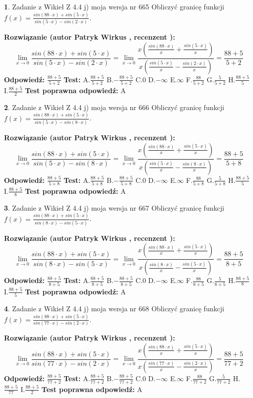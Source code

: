 \documentclass[12pt, a4paper]{article}
\theoremstyle{definition} %
\newtheorem{zad}{}
\newcommand{\zadStart}[1]{\begin{zad}#1\newline}
\newcommand{\zadStop}{\end{zad}}
\newcommand{\rozwStart}[2]{\noindent \textbf{Rozwiązanie (autor #1 , recenzent #2): }\newline}
\newcommand{\rozwStop}{\newline}
\newcommand{\odpStart}{\noindent \textbf{Odpowiedź:}\newline}
\newcommand{\odpStop}{\newline}
\newcommand{\testStart}{\noindent \textbf{Test:}\newline}
\newcommand{\testStop}{\newline}
\newcommand{\kluczStart}{\noindent \textbf{Test poprawna odpowiedź:}\newline}
\newcommand{\kluczStop}{\newline}
\begin{document}
\zadStart{Zadanie z Wikieł Z 4.4 j) moja wersja nr 665}
Obliczyć granicę funkcji $f(x)=\frac{sin(88\cdot x) +sin(5\cdot x)}{sin(5\cdot x) -sin(2\cdot x)}$.
\zadStop
\rozwStart{Patryk Wirkus}{}
$$\lim\limits_{x\to 0}\frac{sin(88\cdot x) +sin(5\cdot x)}{sin(5\cdot x) -sin(2\cdot x)}=\lim\limits_{x\to 0}\frac{x(\frac{sin(88\cdot x)}{x}+\frac{sin(5\cdot x)}{x})}{x(\frac{sin(5\cdot x)}{x}-\frac{sin(2\cdot x)}{x})}=\frac{88+5}{5+2}$$
\rozwStop
\odpStart
$\frac{88+5}{5+2}$
\odpStop
\testStart
A.$\frac{88+5}{5+2}$
B.$-\frac{88+5}{5+2}$
C.$0$
D.$-\infty$
E.$\infty$
F.$\frac{88}{5+2}$
G.$\frac{5}{5+2}$
H.$\frac{88+5}{5}$
I.$\frac{88+5}{2}$
\testStop
\kluczStart
A
\kluczStop



\zadStart{Zadanie z Wikieł Z 4.4 j) moja wersja nr 666}
Obliczyć granicę funkcji $f(x)=\frac{sin(88\cdot x) +sin(5\cdot x)}{sin(5\cdot x) -sin(8\cdot x)}$.
\zadStop
\rozwStart{Patryk Wirkus}{}
$$\lim\limits_{x\to 0}\frac{sin(88\cdot x) +sin(5\cdot x)}{sin(5\cdot x) -sin(8\cdot x)}=\lim\limits_{x\to 0}\frac{x(\frac{sin(88\cdot x)}{x}+\frac{sin(5\cdot x)}{x})}{x(\frac{sin(5\cdot x)}{x}-\frac{sin(8\cdot x)}{x})}=\frac{88+5}{5+8}$$
\rozwStop
\odpStart
$\frac{88+5}{5+8}$
\odpStop
\testStart
A.$\frac{88+5}{5+8}$
B.$-\frac{88+5}{5+8}$
C.$0$
D.$-\infty$
E.$\infty$
F.$\frac{88}{5+8}$
G.$\frac{5}{5+8}$
H.$\frac{88+5}{5}$
I.$\frac{88+5}{8}$
\testStop
\kluczStart
A
\kluczStop



\zadStart{Zadanie z Wikieł Z 4.4 j) moja wersja nr 667}
Obliczyć granicę funkcji $f(x)=\frac{sin(88\cdot x) +sin(5\cdot x)}{sin(8\cdot x) -sin(5\cdot x)}$.
\zadStop
\rozwStart{Patryk Wirkus}{}
$$\lim\limits_{x\to 0}\frac{sin(88\cdot x) +sin(5\cdot x)}{sin(8\cdot x) -sin(5\cdot x)}=\lim\limits_{x\to 0}\frac{x(\frac{sin(88\cdot x)}{x}+\frac{sin(5\cdot x)}{x})}{x(\frac{sin(8\cdot x)}{x}-\frac{sin(5\cdot x)}{x})}=\frac{88+5}{8+5}$$
\rozwStop
\odpStart
$\frac{88+5}{8+5}$
\odpStop
\testStart
A.$\frac{88+5}{8+5}$
B.$-\frac{88+5}{8+5}$
C.$0$
D.$-\infty$
E.$\infty$
F.$\frac{88}{8+5}$
G.$\frac{5}{8+5}$
H.$\frac{88+5}{8}$
I.$\frac{88+5}{5}$
\testStop
\kluczStart
A
\kluczStop



\zadStart{Zadanie z Wikieł Z 4.4 j) moja wersja nr 668}
Obliczyć granicę funkcji $f(x)=\frac{sin(88\cdot x) +sin(5\cdot x)}{sin(77\cdot x) -sin(2\cdot x)}$.
\zadStop
\rozwStart{Patryk Wirkus}{}
$$\lim\limits_{x\to 0}\frac{sin(88\cdot x) +sin(5\cdot x)}{sin(77\cdot x) -sin(2\cdot x)}=\lim\limits_{x\to 0}\frac{x(\frac{sin(88\cdot x)}{x}+\frac{sin(5\cdot x)}{x})}{x(\frac{sin(77\cdot x)}{x}-\frac{sin(2\cdot x)}{x})}=\frac{88+5}{77+2}$$
\rozwStop
\odpStart
$\frac{88+5}{77+2}$
\odpStop
\testStart
A.$\frac{88+5}{77+2}$
B.$-\frac{88+5}{77+2}$
C.$0$
D.$-\infty$
E.$\infty$
F.$\frac{88}{77+2}$
G.$\frac{5}{77+2}$
H.$\frac{88+5}{77}$
I.$\frac{88+5}{2}$
\testStop
\kluczStart
A
\kluczStop
\end{document}
